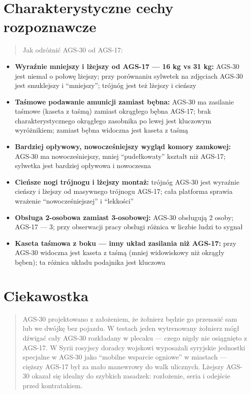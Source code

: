 \documentclass[12pt,openany,oneside]{book}
\providecommand{\tightlist}{%
  \setlength{\itemsep}{0pt}\setlength{\parskip}{0pt}}
\begin{document}
\section{Charakterystyczne cechy
rozpoznawcze}\label{charakterystyczne-cechy-rozpoznawcze-83}

\begin{quote}
Jak odróżnić AGS-30 od AGS-17:
\end{quote}

\begin{itemize}
\tightlist
\item
  \textbf{Wyraźnie mniejszy i lżejszy od AGS-17 --- 16 kg vs 31 kg:}
  AGS-30 jest niemal o połowę lżejszy; przy porównaniu sylwetek na
  zdjęciach AGS-30 jest smuklejszy i ``mniejszy''; trójnóg jest też
  lżejszy i cieńszy
\item
  \textbf{Taśmowe podawanie amunicji zamiast bębna:} AGS-30 ma zasilanie
  taśmowe (kaseta z taśmą) zamiast okrągłego bębna AGS-17; brak
  charakterystycznego okrągłego zasobnika po lewej jest kluczowym
  wyróżnikiem; zamiast bębna widoczna jest kaseta z taśmą
\item
  \textbf{Bardziej opływowy, nowocześniejszy wygląd komory zamkowej:}
  AGS-30 ma nowocześniejszy, mniej ``pudełkowaty'' kształt niż AGS-17;
  sylwetka jest bardziej opływowa i nowoczesna
\item
  \textbf{Cieńsze nogi trójnogu i lżejszy montaż:} trójnóg AGS-30 jest
  wyraźnie cieńszy i lżejszy od masywnego trójnogu AGS-17; cała
  platforma sprawia wrażenie ``nowocześ­niejszej'' i ``lekkości''
\item
  \textbf{Obsługa 2-osobowa zamiast 3-osobowej:} AGS-30 obsługują 2
  osoby; AGS-17 --- 3; przy obserwacji pracy obsługi różnica w liczbie
  ludzi to sygnał
\item
  \textbf{Kaseta taśmowa z boku --- inny układ zasilania niż AGS-17:}
  przy AGS-30 widoczna jest kaseta z taśmą (mniej widowiskowy niż
  okrągły bęben); ta różnica układu podajnika jest kluczowa
\end{itemize}

\section{Ciekawostka}\label{ciekawostka-83}

\begin{quote}
AGS-30 projektowano z założeniem, że żołnierz będzie go przenosić sam
lub we dwójkę bez pojazdu. W testach jeden wytrenowany żołnierz mógł
dźwigać cały AGS-30 rozkładany w plecaku --- czego nigdy nie osiągnięto
z AGS-17. W Syrii rosyjscy doradcy wojskowi wyposażali syryjskie
jednostki specjalne w AGS-30 jako ``mobilne wsparcie ogniowe'' w
miastach --- cięższy AGS-17 był za mało manewrowy do walk ulicznych.
Lżejszy AGS-30 okazał się idealny do szybkich zasadzek: rozłożenie,
seria i odejście przed kontratakiem.
\end{quote}
\end{document}
